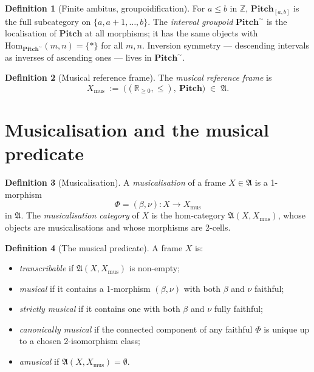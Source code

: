 \documentclass[11pt]{article}
\theoremstyle{definition}
\newtheorem{definition}{Definition}[section]
\theoremstyle{plain}
\theoremstyle{remark}
\newcommand{\Pitch}{\mathbf{Pitch}}
\newcommand{\Frame}{\mathfrak{A}}
\newcommand{\R}{\mathbb{R}}
\newcommand{\Z}{\mathbb{Z}}
\newcommand{\Xmus}{X_{\mathrm{mus}}}
\begin{document}
\begin{definition}[Finite ambitus, groupoidification]
For $a \leq b$ in $\Z$, $\Pitch_{[a,b]}$ is the full subcategory on
$\{a, a{+}1, \ldots, b\}$. The \emph{interval groupoid}
$\Pitch^\sim$ is the localisation of $\Pitch$ at all morphisms; it
has the same objects with $\mathrm{Hom}_{\Pitch^\sim}(m, n) = \{*\}$
for all $m, n$. Inversion symmetry — descending intervals as
inverses of ascending ones — lives in $\Pitch^\sim$.
\end{definition}

\begin{definition}[Musical reference frame]
The \emph{musical reference frame} is
\[
\Xmus \;:=\; \bigl((\R_{\geq 0}, \leq),\ \Pitch\bigr) \;\in\; \Frame.
\]
\end{definition}

\section{Musicalisation and the musical predicate}

\begin{definition}[Musicalisation]
A \emph{musicalisation} of a frame $X \in \Frame$ is a 1-morphism
\[
\Phi = (\beta, \nu) : X \longrightarrow \Xmus
\]
in $\Frame$. The \emph{musicalisation category} of $X$ is the
hom-category $\Frame(X, \Xmus)$, whose objects are musicalisations
and whose morphisms are 2-cells.
\end{definition}

\begin{definition}[The musical predicate]\label{def:predicate}
A frame $X$ is:
\begin{itemize}[leftmargin=2em]
\item \emph{transcribable} if $\Frame(X, \Xmus)$ is non-empty;
\item \emph{musical} if it contains a 1-morphism $(\beta, \nu)$ with
both $\beta$ and $\nu$ faithful;
\item \emph{strictly musical} if it contains one with both
$\beta$ and $\nu$ fully faithful;
\item \emph{canonically musical} if the connected component of any
faithful $\Phi$ is unique up to a chosen 2-isomorphism class;
\item \emph{amusical} if $\Frame(X, \Xmus) = \emptyset$.
\end{itemize}
\end{definition}
\end{document}
